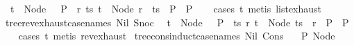 \begin{isabellebody}
\ \ {\isachardoublequoteopen}{\isacharparenleft}{\kern0pt}t\ {\isacharequal}{\kern0pt}\ Node\ {\isacharbrackleft}{\kern0pt}{\isacharbrackright}{\kern0pt}\ {\isasymLongrightarrow}\ P{\isacharparenright}{\kern0pt}\ {\isasymLongrightarrow}\ {\isacharparenleft}{\kern0pt}{\isasymAnd}r\ ts{\isachardot}{\kern0pt}\ t\ {\isacharequal}{\kern0pt}\ Node\ {\isacharparenleft}{\kern0pt}r\ {\isacharhash}{\kern0pt}\ ts{\isacharparenright}{\kern0pt}\ {\isasymLongrightarrow}\ P{\isacharparenright}{\kern0pt}\ {\isasymLongrightarrow}\ P{\isachardoublequoteclose}\isanewline
%
\isadelimproof
\ \ %
\endisadelimproof
%
\isatagproof
{}\isamarkupfalse%
\ {\isacharparenleft}{\kern0pt}cases\ t{\isacharparenright}{\kern0pt}\ {\isacharparenleft}{\kern0pt}metis\ list{\isachardot}{\kern0pt}exhaust{\isacharparenright}{\kern0pt}%
\endisatagproof
{\isafoldproof}%
%
\isadelimproof
\isanewline
%
\endisadelimproof
\isanewline
{}\isamarkupfalse%
\ tree{\isacharunderscore}{\kern0pt}rev{\isacharunderscore}{\kern0pt}exhaust{\isacharbrackleft}{\kern0pt}case{\isacharunderscore}{\kern0pt}names\ Nil\ Snoc{\isacharbrackright}{\kern0pt}{\isacharcolon}{\kern0pt}\isanewline
\ \ {\isachardoublequoteopen}{\isacharparenleft}{\kern0pt}t\ {\isacharequal}{\kern0pt}\ Node\ {\isacharbrackleft}{\kern0pt}{\isacharbrackright}{\kern0pt}\ {\isasymLongrightarrow}\ P{\isacharparenright}{\kern0pt}\ {\isasymLongrightarrow}\ {\isacharparenleft}{\kern0pt}{\isasymAnd}ts\ r{\isachardot}{\kern0pt}\ t\ {\isacharequal}{\kern0pt}\ Node\ {\isacharparenleft}{\kern0pt}ts\ {\isacharat}{\kern0pt}\ {\isacharbrackleft}{\kern0pt}r{\isacharbrackright}{\kern0pt}{\isacharparenright}{\kern0pt}\ {\isasymLongrightarrow}\ P{\isacharparenright}{\kern0pt}\ {\isasymLongrightarrow}\ P{\isachardoublequoteclose}\isanewline
%
\isadelimproof
\ \ %
\endisadelimproof
%
\isatagproof
{}\isamarkupfalse%
\ {\isacharparenleft}{\kern0pt}cases\ t{\isacharparenright}{\kern0pt}\ {\isacharparenleft}{\kern0pt}metis\ rev{\isacharunderscore}{\kern0pt}exhaust{\isacharparenright}{\kern0pt}%
\endisatagproof
{\isafoldproof}%
%
\isadelimproof
\isanewline
%
\endisadelimproof
\isanewline
{}\isamarkupfalse%
\ tree{\isacharunderscore}{\kern0pt}cons{\isacharunderscore}{\kern0pt}induct{\isacharbrackleft}{\kern0pt}case{\isacharunderscore}{\kern0pt}names\ Nil\ Cons{\isacharbrackright}{\kern0pt}{\isacharcolon}{\kern0pt}\isanewline
\ \ \ {\isachardoublequoteopen}P\ {\isacharparenleft}{\kern0pt}Node\ {\isacharbrackleft}{\kern0pt}{\isacharbrackright}{\kern0pt}{\isacharparenright}{\kern0pt}{\isachardoublequoteclose}\isanewline

\end{isabellebody}
